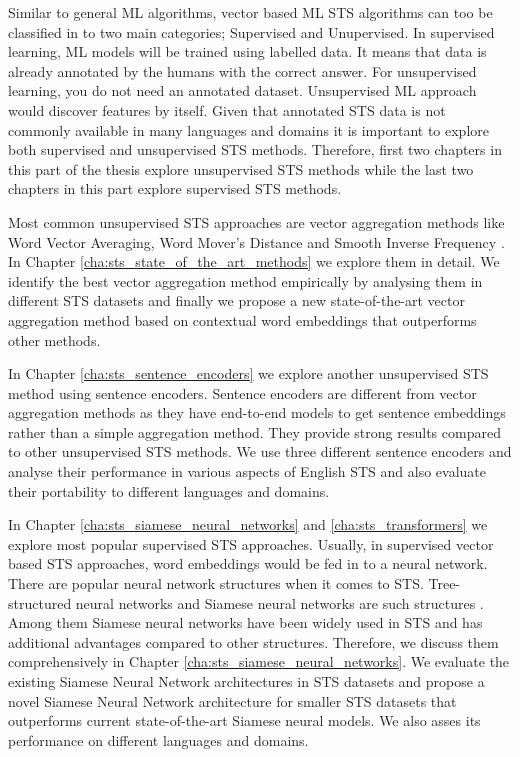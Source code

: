Similar to general ML algorithms, vector based ML STS algorithms can too be classified in to two main categories; Supervised and Unupervised. In supervised learning, ML models will be trained using labelled data. It means that data is already annotated by the humans with the correct answer. For unsupervised learning, you do not need an annotated dataset. Unsupervised ML approach would discover features by itself. Given that annotated STS data is not commonly available in many languages and domains it is important to explore both supervised and unsupervised STS methods. Therefore, first two chapters in this part of the thesis explore unsupervised STS methods while the last two chapters in this part explore supervised STS methods. 

Most common unsupervised STS approaches are vector aggregation methods like Word Vector Averaging, Word Mover's Distance \cite{10.5555/3045118.3045221} and Smooth Inverse Frequency \cite{DBLP:conf/iclr/AroraLM17}. In Chapter \ref{cha:sts_state_of_the_art_methods} we explore them in detail. We identify the best vector aggregation method empirically by analysing them in different STS datasets and finally we propose a new state-of-the-art vector aggregation method based on contextual word embeddings that outperforms other methods. 

In Chapter \ref{cha:sts_sentence_encoders} we explore another unsupervised STS method using sentence encoders. Sentence encoders are different from vector aggregation methods as they have end-to-end models to get sentence embeddings rather than a simple aggregation method. They provide strong results compared to other unsupervised STS methods. We use three different sentence encoders and analyse their performance in various aspects of English STS and also evaluate their portability to different languages and domains. 


In Chapter \ref{cha:sts_siamese_neural_networks} and \ref{cha:sts_transformers} we explore most popular supervised STS approaches. Usually, in supervised vector based STS approaches, word embeddings would be fed in to a neural network. There are popular neural network structures when it comes to STS. Tree-structured neural networks \cite{tai-etal-2015-improved} and Siamese neural networks are such structures \cite{Mueller_Thyagarajan_2016}. Among them Siamese neural networks have been widely used in STS and has additional advantages compared to other structures. Therefore, we discuss them comprehensively in Chapter \ref{cha:sts_siamese_neural_networks}. We evaluate the existing Siamese Neural Network architectures in STS datasets and propose a novel Siamese Neural Network architecture for smaller STS datasets that outperforms current state-of-the-art Siamese neural models.  We also asses its performance on different languages and domains.

